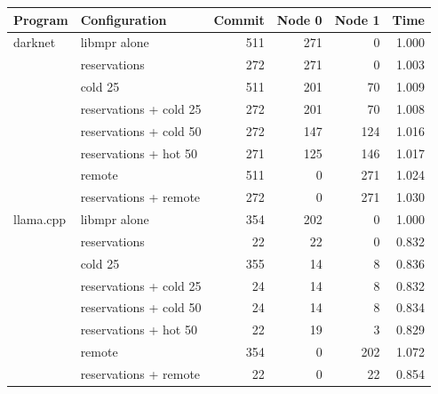 \begin{tabular}{llrrrr}
\toprule
Program & Configuration & Commit & Node 0 & Node 1 & Time \\
\midrule
darknet & libmpr alone & 511 & 271 & 0 & 1.000 \\
 & reservations & 272 & 271 & 0 & 1.003 \\
 & cold 25 & 511 & 201 & 70 & 1.009 \\
 & reservations + cold 25 & 272 & 201 & 70 & 1.008 \\
 & reservations + cold 50 & 272 & 147 & 124 & 1.016 \\
 & reservations + hot 50 & 271 & 125 & 146 & 1.017 \\
 & remote & 511 & 0 & 271 & 1.024 \\
 & reservations + remote & 272 & 0 & 271 & 1.030 \\
\addlinespace
llama.cpp & libmpr alone & 354 & 202 & 0 & 1.000 \\
 & reservations & 22 & 22 & 0 & 0.832 \\
 & cold 25 & 355 & 14 & 8 & 0.836 \\
 & reservations + cold 25 & 24 & 14 & 8 & 0.832 \\
 & reservations + cold 50 & 24 & 14 & 8 & 0.834 \\
 & reservations + hot 50 & 22 & 19 & 3 & 0.829 \\
 & remote & 354 & 0 & 202 & 1.072 \\
 & reservations + remote & 22 & 0 & 22 & 0.854 \\
\bottomrule
\end{tabular}
